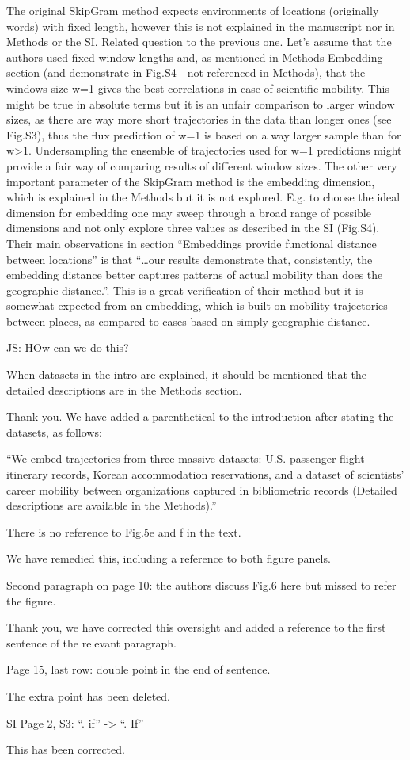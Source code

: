 \documentclass[12pt,a4paper]{article}
\newcommand{\response}[1]{{\leavevmode\noindent #1}}
\newcommand{\rcomment}[1]{%
\vspace{10pt}
\begin{tcolorbox}[colback=black!3,colframe=white!45!black]
#1
\end{tcolorbox}
}
\begin{document}
\rcomment{

The original SkipGram method expects environments of locations (originally words) with fixed length, however this is not explained in the manuscript nor in Methods or the SI.
Related question to the previous one. Let’s assume that the authors used fixed window lengths and, as mentioned in Methods Embedding section (and demonstrate in Fig.S4 - not referenced in Methods), that the windows size w=1 gives the best correlations in case of scientific mobility. This might be true in absolute terms but it is an unfair comparison to larger window sizes, as there are way more short trajectories in the data than longer ones (see Fig.S3), thus the flux prediction of w=1 is based on a way larger sample than for w>1. Undersampling the ensemble of trajectories used for w=1 predictions might provide a fair way of comparing results of different window sizes.
The other very important parameter of the SkipGram method is the embedding dimension, which is explained in the Methods but it is not explored. E.g. to choose the ideal dimension for embedding one may sweep through a broad range of possible dimensions and not only explore three values as described in the SI (Fig.S4).
Their main observations in section “Embeddings provide functional distance between locations” is that “…our results demonstrate that, consistently, the embedding distance better captures patterns of actual mobility than does the geographic distance.”. This is a great verification of their method but it is somewhat expected from an embedding, which is built on mobility trajectories between places, as compared to cases based on simply geographic distance.

}
\response{
JS: HOw can we do this?
}

\rcomment{
When datasets in the intro are explained, it should be mentioned that the detailed descriptions are in the Methods section.
}
\response{
Thank you. We have added a parenthetical to the introduction after stating the datasets, as follows: 

“We embed trajectories from three massive datasets: U.S. passenger flight itinerary records, Korean accommodation reservations, and a dataset of scientists' career mobility between organizations captured in bibliometric records (Detailed descriptions are available in the Methods).”
}
\rcomment{
There is no reference to Fig.5e and f in the text.

}
\response{
We have remedied this, including a reference to both figure panels.

}
\rcomment{
Second paragraph on page 10: the authors discuss Fig.6 here but missed to refer the figure.

}
\response{

Thank you, we have corrected this oversight and added a reference to the first sentence of the relevant paragraph. 

}
\rcomment{
Page 15, last row: double point in the end of sentence.

}
\response{
The extra point has been deleted. 
}
\rcomment{
SI Page 2, S3: “. if” -> “. If”

}
\response{
This has been corrected. 
}
\end{document}
